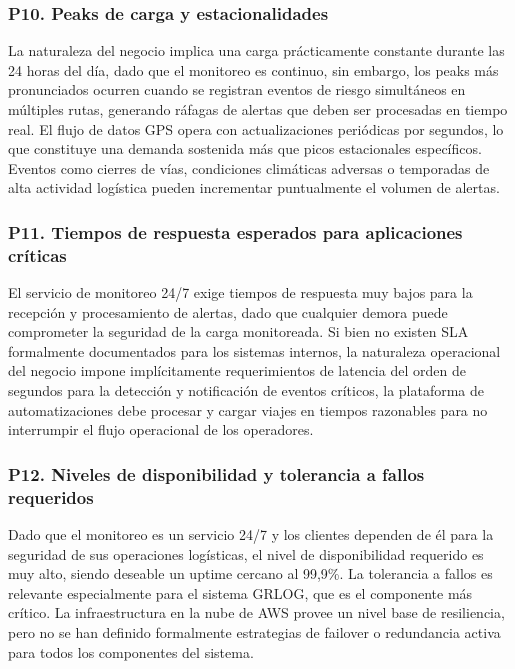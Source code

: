 \documentclass[12pt]{article}
\begin{document}
\subsubsection*{\textbf{P10. Peaks de carga y estacionalidades}}

La naturaleza del negocio implica una carga pr\'acticamente constante durante las 24 horas del
d\'ia, dado que el monitoreo es continuo, sin embargo, los peaks m\'as pronunciados ocurren
cuando se registran eventos de riesgo simult\'aneos en m\'ultiples rutas, generando r\'afagas
de alertas que deben ser procesadas en tiempo real. El flujo de datos GPS opera con actualizaciones
peri\'odicas por segundos, lo que constituye una demanda sostenida m\'as que picos estacionales
espec\'ificos. Eventos como cierres de v\'ias, condiciones clim\'aticas adversas o temporadas
de alta actividad log\'istica pueden incrementar puntualmente el volumen de alertas.

\subsubsection*{\textbf{P11. Tiempos de respuesta esperados para aplicaciones cr\'iticas}}

El servicio de monitoreo 24/7 exige tiempos de respuesta muy bajos para la recepci\'on y
procesamiento de alertas, dado que cualquier demora puede comprometer la seguridad de la carga
monitoreada. Si bien no existen SLA formalmente documentados para los sistemas internos, la
naturaleza operacional del negocio impone impl\'icitamente requerimientos de latencia del orden
de segundos para la detecci\'on y notificaci\'on de eventos cr\'iticos, la plataforma de
automatizaciones debe procesar y cargar viajes en tiempos razonables para no interrumpir
el flujo operacional de los operadores.

\subsubsection*{\textbf{P12. Niveles de disponibilidad y tolerancia a fallos requeridos}}

Dado que el monitoreo es un servicio 24/7 y los clientes dependen de \'el para la seguridad
de sus operaciones log\'isticas, el nivel de disponibilidad requerido es muy alto, siendo
deseable un uptime cercano al 99{,}9\%. La tolerancia a fallos es relevante especialmente
para el sistema GRLOG, que es el componente m\'as cr\'itico. La infraestructura en la nube
de AWS provee un nivel base de resiliencia, pero no se han definido formalmente estrategias
de failover o redundancia activa para todos los componentes del sistema.
\end{document}
